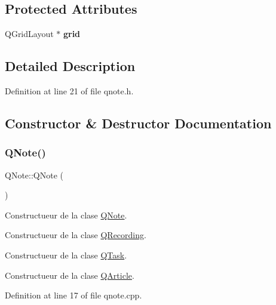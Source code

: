 \subsection*{Protected Attributes}
\begin{DoxyCompactItemize}
\item 
\mbox{\label{class_q_note_a126c0984d4769bd7a565e1303eac3184}} 
Q\+Grid\+Layout $\ast$ {\bfseries grid}
\end{DoxyCompactItemize}


\subsection{Detailed Description}


Definition at line 21 of file qnote.\+h.



\subsection{Constructor \& Destructor Documentation}
\mbox{\label{class_q_note_a4f3980466d58be3cb5e15d2e45d74840}} 
\subsubsection{\texorpdfstring{Q\+Note()}{QNote()}}
{\footnotesize\ttfamily Q\+Note\+::\+Q\+Note (\begin{DoxyParamCaption}{ }\end{DoxyParamCaption})}



Constructueur de la clase \hyperlink{class_q_note}{Q\+Note}. 

Constructueur de la clase \hyperlink{class_q_recording}{Q\+Recording}.

Constructueur de la clase \hyperlink{class_q_task}{Q\+Task}.

Constructueur de la clase \hyperlink{class_q_article}{Q\+Article}. 

Definition at line 17 of file qnote.\+cpp.

